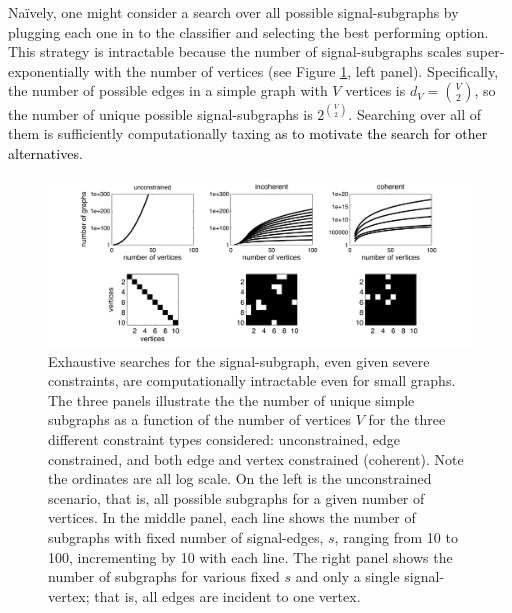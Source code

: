 \documentclass[10pt,journal,cspaper,compsoc]{IEEEtran}
\providecommand{\tk}[1]{\textcolor{black}{#1}}
\newcommand{\comment}[1]{}
\begin{document}
Na\"{i}vely, one might consider a search over all possible signal-subgraphs by plugging each one in to the classifier and selecting the best performing option.  This strategy is intractable because the number of signal-subgraphs scales super-exponentially with the number of vertices (see Figure \ref{fig:numgraphs}, left panel). Specifically, the number of possible edges in a simple graph with $V$ vertices is $d_V=\binom{V}{2}$, so the number of unique possible signal-subgraphs is $2^{\binom{V}{2}}$.  Searching over all of them is sufficiently computationally taxing %
\tk{as to motivate the search for other alternatives.}
\comment{We therefore consider several alternatives.}





\begin{figure}[tb!]
	\centering
		\includegraphics[width=1.0\linewidth]{../figs/num_of_graphs.pdf}
	\caption{Exhaustive searches for the signal-subgraph, even given severe constraints, are computationally intractable even for small graphs.  The three panels illustrate the 
	the number of unique simple subgraphs as a function of the number of vertices $V$
	for the three different constraint types considered: unconstrained, edge constrained, and both edge and vertex constrained (coherent).  Note the ordinates are all log scale.   On the left is the unconstrained scenario, that is, all possible subgraphs for a given number of vertices.  In the middle panel, each line shows the number of subgraphs with fixed number of signal-edges, $s$, ranging from 10 to 100, incrementing by 10 with each line.  The right panel shows the number of subgraphs for various fixed $s$ and only a single signal-vertex; that is, all edges are incident to one vertex.  %
	}
	\label{fig:numgraphs}
\end{figure}
\end{document}
